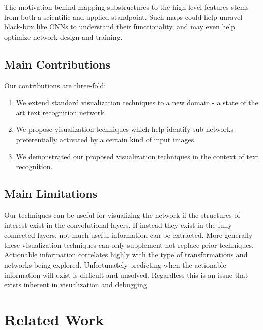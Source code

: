 \documentclass[10pt,twocolumn,letterpaper]{article}
\begin{document}
The motivation behind mapping substructures to the high level features stems from both a scientific and applied standpoint. Such maps could help unravel black-box like CNNs to understand their functionality, and may even help optimize network design and training.


\subsection{Main Contributions}
Our contributions are three-fold:
\begin{enumerate}
\item We extend standard visualization techniques to a new domain - a state of the art text recognition network.


\item We propose visualization techniques which help identify sub-networks preferentially activated by a certain kind of input images.


\item We demonstrated our proposed visualization techniques in the context of text recognition.
\end{enumerate}


\subsection{Main Limitations}
Our techniques can be useful for visualizing the network if the structures of interest exist in the convolutional layers. If instead they exist in the fully connected layers, not much useful information can be extracted. More generally these visualization techniques can only supplement not replace prior techniques. Actionable information correlates highly with the type of transformations and networks being explored. Unfortunately predicting when the actionable information will exist is difficult and unsolved. Regardless this is an issue that exists inherent in visualization and debugging.


\section{Related Work}
\end{document}
